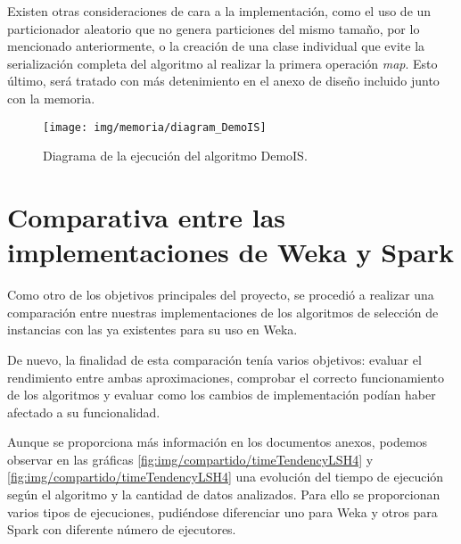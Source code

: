Existen otras consideraciones de cara a la implementación, como el uso de un particionador aleatorio que no genera particiones del mismo tamaño, por lo mencionado anteriormente, o la creación de una clase individual que evite la serialización completa del algoritmo al realizar la primera operación \textit{map}. Esto último, será tratado con más detenimiento en el anexo de diseño incluido junto con la memoria.


	\begin{figure}[!h]
		\centering
		\texttt{[image: img/memoria/diagram\_DemoIS]}
		\caption{Diagrama de la ejecución del algoritmo DemoIS.}\label{fig:img/memoria/diagram_DemoIS}
	\end{figure}
	\FloatBarrier


\section{Comparativa entre las implementaciones de Weka y Spark}

Como otro de los objetivos principales del proyecto, se procedió a realizar una comparación entre nuestras implementaciones de los algoritmos de selección de instancias con las ya existentes para su uso en Weka.

De nuevo, la finalidad de esta comparación tenía varios objetivos: evaluar el rendimiento entre ambas aproximaciones, comprobar el correcto funcionamiento de los algoritmos y evaluar como los cambios de implementación podían haber afectado a su funcionalidad.

Aunque se proporciona más información en los documentos anexos, podemos observar en las gráficas \ref{fig:img/compartido/timeTendencyLSH4} y \ref{fig:img/compartido/timeTendencyLSH4} una evolución del tiempo de ejecución según el algoritmo y la cantidad de datos analizados. Para ello se proporcionan varios tipos de ejecuciones, pudiéndose diferenciar uno para Weka y otros para Spark con diferente número de ejecutores.

